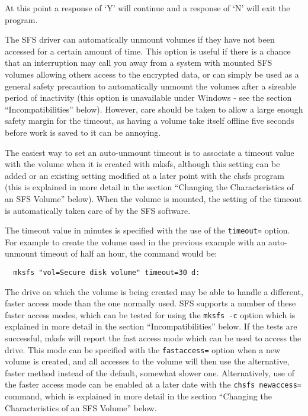 At this point a response of `Y' will continue and a response of `N' will exit
the program.

The SFS driver can automatically unmount volumes if they have not been accessed
for a certain amount of time.  This option is useful if there is a chance that
an interruption may call you away from a system with mounted SFS volumes
allowing others access to the encrypted data, or can simply be used as a
general safety precaution to automatically unmount the volumes after a sizeable
period of inactivity (this option is unavailable under Windows - see the
section ``Incompatibilities'' below).  However, care should be taken to allow a
large enough safety margin for the timeout, as having a volume take itself
offline five seconds before work is saved to it can be annoying.

The easiest way to set an auto-unmount timeout is to associate a timeout value
with the volume when it is created with mksfs, although this setting can be
added or an existing setting modified at a later point with the chsfs program
(this is explained in more detail in the section ``Changing the Characteristics
of an SFS Volume'' below).  When the volume is mounted, the setting of the
timeout is automatically taken care of by the SFS software.

The timeout value in minutes is specified with the use of the {\tt timeout=}
option.  For example to create the volume used in the previous example with an
auto-unmount timeout of half an hour, the command would be:

\begin{verbatim}
  mksfs "vol=Secure disk volume" timeout=30 d:
\end{verbatim}

The drive on which the volume is being created may be able to handle a
different, faster access mode than the one normally used.  SFS supports a
number of these faster access modes, which can be tested for using the {\tt mksfs
-c} option which is explained in more detail in the section ``Incompatibilities''
below.  If the tests are successful, mksfs will report the fast access mode
which can be used to access the drive.  This mode can be specified with the
{\tt fastaccess=} option when a new volume is created, and all accesses to the
volume will then use the alternative, faster method instead of the default,
somewhat slower one.  Alternatively, use of the faster access mode can be
enabled at a later date with the {\tt chsfs newaccess=} command, which is explained
in more detail in the section ``Changing the Characteristics of an SFS Volume''
below.

